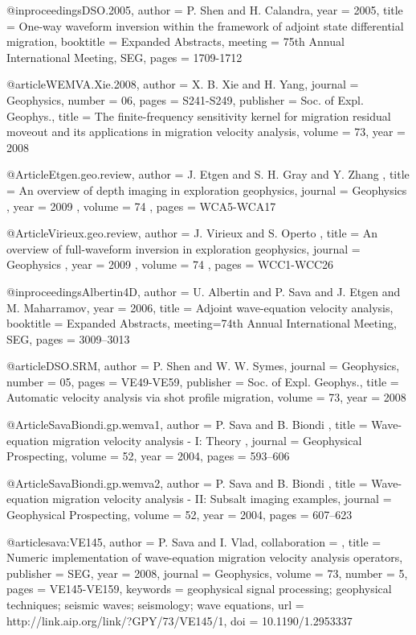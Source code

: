 @inproceedings{DSO.2005,
  author    = {P. Shen and H. Calandra},
  year      = {2005},
  title     = {One-way waveform inversion within the framework of
adjoint state differential migration},
  booktitle = {Expanded Abstracts},
  meeting   = {75th Annual International Meeting, SEG},
  pages     = {1709-1712}
}

@article{WEMVA.Xie.2008,
  author = { X. B. Xie and H. Yang},
  journal = {Geophysics},
  number = {06},
  pages = {S241-S249},
  publisher = {Soc. of Expl. Geophys.},
  title = {The finite-frequency sensitivity kernel for migration
residual moveout and its applications in migration velocity analysis},
  volume = {73},
  year = {2008}}

@Article{Etgen.geo.review,
 author =  { J. Etgen and  S. H. Gray and Y. Zhang },
 title =   { An overview of depth imaging in exploration geophysics},
 journal = { Geophysics },
 year =    { 2009 },
 volume =  { 74 },
 pages =   { WCA5-WCA17 }
}

@Article{Virieux.geo.review,
 author =  { J. Virieux and S. Operto },
 title =   { An overview of full-waveform inversion in exploration geophysics},
 journal = { Geophysics },
 year =    { 2009 },
 volume =  { 74 },
 pages =   { WCC1-WCC26 }
}


@inproceedings{Albertin4D,
  author = {U. Albertin and P. Sava and J. Etgen and M.
Maharramov},
  year = {2006},
  title = { Adjoint wave-equation velocity analysis},
  booktitle = {Expanded Abstracts},
  meeting={74th Annual International Meeting, SEG},
  pages = {3009--3013}
}

@article{DSO.SRM,
  author = {P. Shen and W. W. Symes},
  journal = {Geophysics},
  number = {05},
  pages = {VE49-VE59},
  publisher = {Soc. of Expl. Geophys.},
  title = {Automatic velocity analysis via shot profile migration},
  volume = {73},
  year = {2008}}


@Article{SavaBiondi.gp.wemva1,
 author =  { P. Sava and B. Biondi },
 title =   { Wave-equation migration velocity analysis - {I}: {Theory} },
 journal = {Geophysical Prospecting},
 volume = {52},
 year =   {2004},
 pages =  {593--606}
}

@Article{SavaBiondi.gp.wemva2,
 author =  { P. Sava and B. Biondi },
 title =   { Wave-equation migration velocity analysis - {II}:
{Subsalt} imaging examples},
 journal = {Geophysical Prospecting},
 volume = {52},
 year =   {2004},
 pages =  {607--623}
}




@article{sava:VE145,
author = {P. Sava and I. Vlad},
collaboration = {},
title = {Numeric implementation of wave-equation migration velocity analysis operators},
publisher = {SEG},
year = {2008},
journal = {Geophysics},
volume = {73},
number = {5},
pages = {VE145-VE159},
keywords = {geophysical signal processing; geophysical techniques; seismic waves; seismology; wave equations},
url = {http://link.aip.org/link/?GPY/73/VE145/1},
doi = {10.1190/1.2953337}
}




